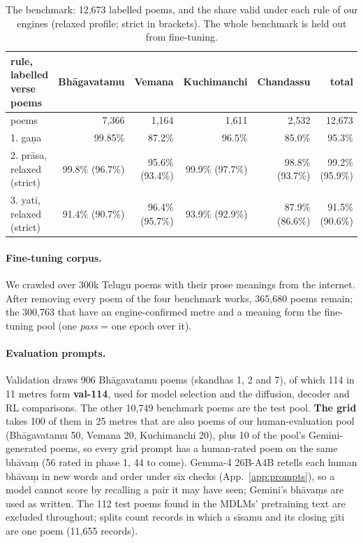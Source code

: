 \documentclass[11pt]{article}
\begin{document}
\begin{table}[t]
\centering\footnotesize
\begin{tabular}{@{}lrrrrr@{}}
\toprule
rule, labelled verse poems & Bhāgavatamu & Vemana & Kuchimanchi & Chandassu & total \\
\midrule
poems & 7,366 & 1,164 & 1,611 & 2,532 & 12,673 \\
1. gaṇa & 99.85\% & 87.2\% & 96.5\% & 85.0\% & 95.3\% \\
2. prāsa, relaxed (strict) & 99.8\% (96.7\%) & 95.6\% (93.4\%) & 99.9\% (97.7\%) & 98.8\% (93.7\%) & 99.2\% (95.9\%) \\
3. yati, relaxed (strict) & 91.4\% (90.7\%) & 96.4\% (95.7\%) & 93.9\% (92.9\%) & 87.9\% (86.6\%) & 91.5\% (90.6\%) \\
\bottomrule
\end{tabular}
\caption{The benchmark: 12,673 labelled poems, and the share valid under each rule of our engines (relaxed
profile; strict in brackets). The whole benchmark is held out from fine-tuning.}
\label{tab:benchmark}
\end{table}


\paragraph{Fine-tuning corpus.} We crawled over 300k Telugu poems with their prose meanings from the
internet. After removing every poem of the four benchmark works, 365,680 poems remain; the 300,763 that have
an engine-confirmed metre and a meaning form the fine-tuning pool (one \emph{pass} = one epoch over it).

\paragraph{Evaluation prompts.} Validation draws 906 Bhāgavatamu poems (skandhas 1, 2 and 7), of which 114
in 11 metres form \textbf{val-114}, used for model selection and the diffusion, decoder and RL comparisons. The
other 10,749 benchmark poems are the test pool. \textbf{The grid} takes 100 of them in 25 metres that are also
poems of our human-evaluation pool (Bhāgavatamu 50, Vemana 20, Kuchimanchi 20), plus 10 of the pool's
Gemini-generated poems, so every grid prompt has a human-rated poem on the same bhāvaṃ (56 rated in phase 1,
44 to come). Gemma-4 26B-A4B \citep{gemma4_2026} retells each human bhāvaṃ in new words and order under six
checks (App.~\ref{app:prompts}), so a model cannot score by recalling a pair it may have seen; Gemini's
bhāvaṃs are used as written. The 112 test poems found in the MDLMs' pretraining text are excluded throughout;
splits count records in which a sīsamu and its closing gīti are one poem (11,655 records).
\end{document}
